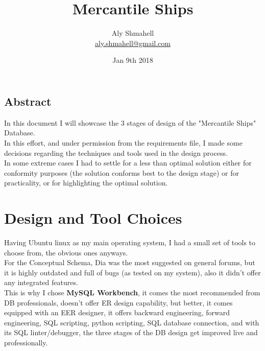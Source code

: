 \documentclass[12pt]{scrartcl}
\begin{document}
	\title{%
		Mercantile Ships
	}
	\author{Aly Shmahell\\%
		\href{aly.shmahell@gmail.com}{aly.shmahell@gmail.com}
	}
	\date{Jan 9th 2018}
	
	\maketitle	
	\newpage
	\begin{center}
		\section*{\hfil \hfil  Abstract \hfil }
	\end{center}
		In this document I will showcase the 3 stages of design of the "Mercantile Ships" Database.\\
		In this effort, and under permission from the requirements file, I made some decisions regarding the techniques and tools used in the design process.\\
		In some extreme cases I had to settle for a less than optimal solution either for conformity purposes (the solution conforms best to the design stage) or for practicality, or for highlighting the optimal solution.\\
\newpage
\section*{\textbf{Design and Tool Choices}}
Having Ubuntu linux as my main operating system, I had a small set of tools to choose from, the obvious ones anyways.\\
For the Conceptual Schema, Dia was the most suggested on general forums, but it is highly outdated and full of bugs (as tested on my system), also it didn't offer any integrated features.\\

This is why I chose \textbf{MySQL Workbench}, it comes the most recommended from DB professionals, doesn't offer ER design capability, but better, it comes equipped with an EER designer, it offers backward engineering, forward engineering, SQL scripting, python scripting, SQL database connection, and with its SQL linter/debugger, the three stages of the DB design get improved live and professionally.\\
\end{document}
